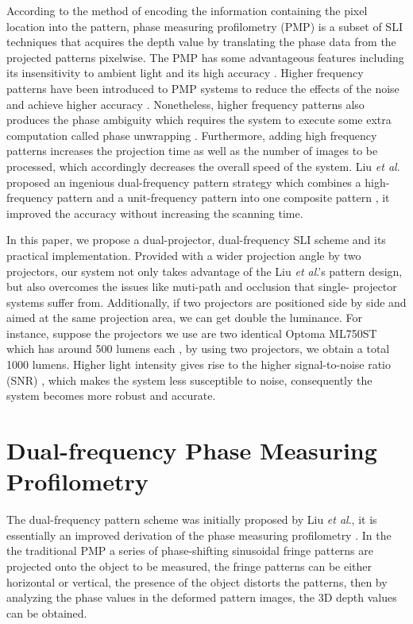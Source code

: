 \documentclass[]{spie}  %
\begin{document}
According to the method of encoding the information containing the pixel location into the pattern, phase measuring profilometry (PMP) \cite{srin85} is a subset of SLI techniques that acquires the depth value by translating the phase data from the projected patterns pixelwise. The PMP has some advantageous features including its insensitivity to ambient light and its high accuracy \cite{guan03, hali89}. Higher frequency patterns have been introduced to PMP systems to reduce the effects of the noise and achieve higher accuracy \cite{lijl03}. Nonetheless, higher frequency patterns also produces the phase ambiguity which requires the system to execute some extra computation called phase unwrapping \cite{song18}. Furthermore, adding high frequency patterns increases the projection time as well as the number of images to be processed, which accordingly decreases the overall speed of the system. Liu \textit{et al}. proposed an ingenious dual-frequency pattern strategy which combines a high-frequency pattern and a unit-frequency pattern into one composite pattern \cite{liuk10}, it improved the accuracy without increasing the scanning time.

In this paper, we propose a dual-projector, dual-frequency SLI scheme and its practical implementation. Provided with a wider projection angle by two projectors, our system not only takes advantage of the Liu \textit{et al}.'s pattern design, but also overcomes the issues like muti-path \cite{otoo16} and occlusion \cite{linj13} that single- projector systems suffer from. Additionally, if two projectors are positioned side by side and aimed at the same projection area, we can get double the luminance. For instance, suppose the projectors we use are two identical Optoma ML750ST which has around 500 lumens each \cite{lume70}, by using two projectors, we obtain a total 1000 lumens. Higher light intensity gives rise to the higher signal-to-noise ratio (SNR) \cite{wangy10}, which makes the system less susceptible to noise, consequently the system becomes more robust and accurate.

\section{Dual-frequency Phase Measuring Profilometry}
The dual-frequency pattern scheme was initially proposed by Liu \textit{et al}.\cite{liuk10}, it is essentially  an improved derivation of the phase measuring profilometry \cite{hali89}. In the the traditional PMP a series of phase-shifting sinusoidal fringe patterns are projected onto the object to be measured, the fringe patterns can be either horizontal or vertical, the presence of the object distorts the patterns, then by analyzing the phase values in the deformed pattern images, the 3D depth values can be obtained.
\end{document}
